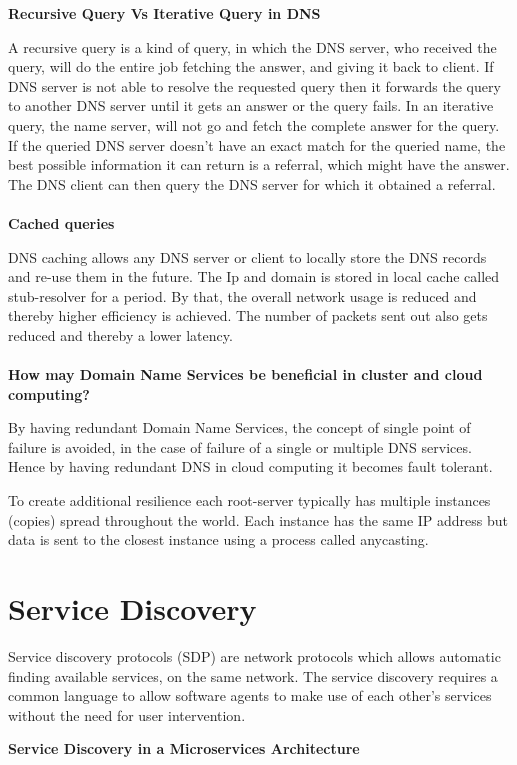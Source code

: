 \textbf{Recursive Query Vs Iterative Query in DNS}

A recursive query is a kind of query, in which the DNS server, who received the query, will do the entire job fetching the answer, and giving it back to client. If DNS server is not able to resolve the requested query then it forwards the query to another DNS server until it gets an answer or the query fails.
In an iterative query, the name server, will not go and fetch the complete answer for the query. If the queried DNS server doesn't have an exact match for the queried name, the best possible information it can return is a referral, which might have the answer. The DNS client can then query the DNS server for which it obtained a referral.
\\\\
\textbf{Cached queries}

DNS caching allows any DNS server or client to locally store the DNS records and re-use them in the future. The Ip and domain is stored in local cache called stub-resolver for a period. By that, the overall network usage is reduced and thereby higher efficiency is achieved. The number of packets sent out also gets reduced and thereby a lower latency. 
\\\\
\textbf{How may Domain Name Services be beneficial in cluster and cloud computing?}


By having redundant Domain Name Services, the concept of single point of failure is avoided, in the case of failure of a single or multiple DNS services. Hence by having redundant DNS in cloud computing it becomes fault tolerant.  


To create additional resilience each root-server typically has multiple instances (copies) spread throughout the world. Each instance has the same IP address but data is sent to the closest instance using a process called anycasting.

\section{Service Discovery}
Service discovery protocols (SDP) are network protocols which allows automatic finding available services, on the same network. The service discovery requires a common language to allow software agents to make use of each other's services without the need for user intervention.


\textbf{Service Discovery in a Microservices Architecture}


